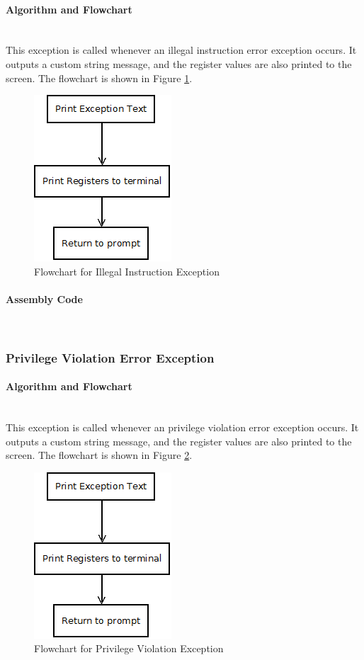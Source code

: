 \documentclass[12pt]{article}
\begin{document}
			\paragraph{Algorithm and Flowchart}~\\
			This exception is called whenever an illegal instruction error exception occurs. It outputs a custom string message, and the register values are also printed to the screen. The flowchart is shown in Figure \ref{fig:Exception}.
			
\begin{figure}[H]
\centering
\includegraphics[width=0.3\linewidth]{Exception}
\caption{Flowchart for Illegal Instruction Exception}
\label{fig:Exception}
\end{figure}
			\paragraph{Assembly Code}~\\	
						
			
			\subsubsection{Privilege Violation Error Exception}
			\paragraph{Algorithm and Flowchart}~\\
			This exception is called whenever an privilege violation error exception occurs. It outputs a custom string message, and the register values are also printed to the screen. The flowchart is shown in Figure \ref{fig:priv}.
			
			
\begin{figure}[H]
\centering
\includegraphics[width=0.3\linewidth]{Exception}
\caption{Flowchart for Privilege Violation Exception}
\label{fig:priv}
\end{figure}
\end{document}
